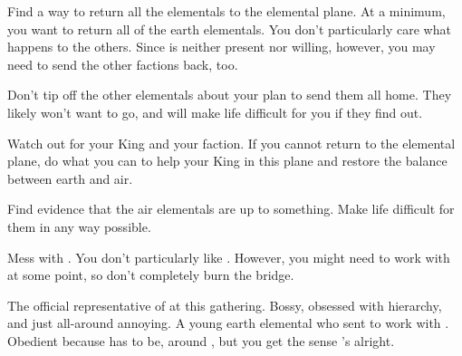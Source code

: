 \documentclass[char]{elementals}
\begin{document}
\begin{itemz}[Goals]
\item Find a way to return all the elementals to the elemental plane.  At a minimum, you want to return all of the earth elementals.  You don't particularly care what happens to the others.  Since \cEarthKing{} is neither present nor willing, however, you may need to send the other factions back, too.
   \item Don't tip off the other elementals about your plan to send them all home.  They likely won't want to go, and will make life difficult for you if they find out.
   \item Watch out for your King and your faction.  If you cannot return to the elemental plane, do what you can to help your King in this plane and restore the balance between earth and air.
	\item Find evidence that the air elementals are up to something.  Make life difficult for them in any way possible.
	\item Mess with \cLoyal{}.  You don't particularly like \cLoyal{\them}.  However, you might need to work with \cLoyal{\them} at some point, so don't completely burn the bridge.
\end{itemz}

\begin{contacts}
	\contact{\cLoyal{}}  The official representative of \cEarthKing{} at this gathering.  Bossy, obsessed with hierarchy, and just all-around annoying.
	\contact{\cMinion{}}  A young earth elemental who \cEarthKing{} sent to work with \cLoyal{}.  Obedient because \cMinion{\they} has to be, around \cLoyal{}, but you get the sense \cMinion{\they}'s  alright.
\end{contacts}
\end{document}
